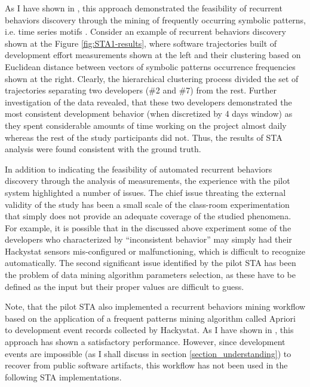 As I have shown in \cite{csdl2-10-09}, this approach demonstrated the feasibility of recurrent behaviors discovery 
through the mining of frequently occurring symbolic patterns, i.e. time series motifs \cite{sax}. 
Consider an example of recurrent behaviors discovery shown at the Figure \ref{fig:STA1-results}, where software 
trajectories built of development effort measurements shown at the left and their clustering based on Euclidean 
distance between vectors of symbolic patterns occurrence frequencies shown at the right. Clearly, the hierarchical clustering 
process divided the set of trajectories separating two developers (\#2 and \#7) from the rest. 
Further investigation of the data revealed, that these two developers demonstrated the most consistent development 
behavior (when discretized by 4 days window) as they spent considerable amounts of time working on the project almost daily
whereas the rest of the study participants did not. 
Thus, the results of STA analysis were found consistent with the ground truth.

In addition to indicating the feasibility of automated recurrent behaviors discovery through the analysis of measurements, 
the experience with the pilot system highlighted a number of issues.
The chief issue threating the external validity of the study has been a small scale of the class-room experimentation that
simply does not provide an adequate coverage of the studied phenomena. 
For example, it is possible that in the discussed above experiment some of the developers who characterized by ``inconsistent 
behavior'' may simply had their Hackystat sensors mis-configured or malfunctioning, which is difficult to recognize automatically.
The second significant issue identified by the pilot STA has been the problem of data mining algorithm parameters 
selection, as these have to be defined as the input but their proper values are difficult to guess.

Note, that the pilot STA also implemented a recurrent behaviors mining workflow based on the application of 
a frequent patterns mining algorithm called Apriori \cite{citeulike:775528} to development event records collected by Hackystat. 
As I have shown in \cite{citeulike:13159603}, this approach has shown a satisfactory performance. 
However, since development events are impossible (as I shall discuss in section \ref{section_understanding}) to recover from 
public software artifacts, this workflow has not been used in the following STA implementations.

